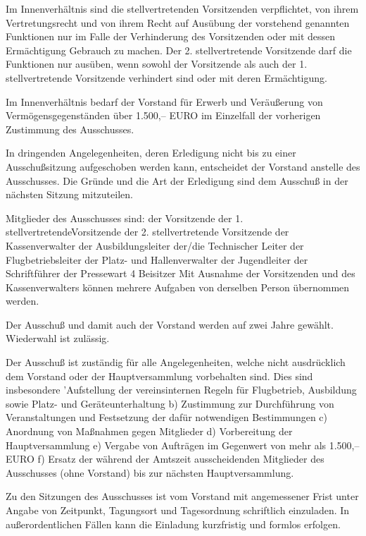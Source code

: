 \documentclass[11pt,a4paper,parskip=half]{scrartcl}
\begin{document}
\begin{contract}
\begin{multicols}{2}
		Im Innenverhältnis sind die stellvertretenden
		Vorsitzenden verpflichtet, von ihrem
		Vertretungsrecht und von ihrem Recht auf
		Ausübung der vorstehend genannten Funktionen
		nur im Falle der Verhinderung des Vorsitzenden
		oder mit dessen Ermächtigung Gebrauch zu
		machen. Der 2. stellvertretende Vorsitzende darf
		die Funktionen nur ausüben, wenn sowohl der
		Vorsitzende als auch der 1. stellvertretende
		Vorsitzende verhindert sind oder mit deren
		Ermächtigung.
		
		Im Innenverhältnis bedarf der Vorstand für
		Erwerb und Veräußerung von
		Vermögensgegenständen über 1.500,-- EURO im
		Einzelfall der vorherigen Zustimmung des
		Ausschusses.
		
		In dringenden Angelegenheiten, deren
		Erledigung nicht bis zu einer Ausschußsitzung
		aufgeschoben werden kann, entscheidet der
		Vorstand anstelle des Ausschusses. Die Gründe und
		die Art der Erledigung sind dem Ausschuß in der
		nächsten Sitzung mitzuteilen.
		
		Mitglieder des Ausschusses
		sind:
		der Vorsitzende
		der 1. stellvertretendeVorsitzende
		der 2. stellvertretende Vorsitzende
		der Kassenverwalter
		der Ausbildungsleiter
		der/die Technischer Leiter
		der Flugbetriebsleiter
		der Platz- und Hallenverwalter
		der Jugendleiter
		der Schriftführer
		der Pressewart
		4 Beisitzer
		Mit Ausnahme der Vorsitzenden und des
		Kassenverwalters können mehrere Aufgaben von
		derselben Person übernommen werden.
		
		Der Ausschuß und damit auch der Vorstand
		werden auf zwei Jahre gewählt. Wiederwahl ist
		zulässig.
		
		Der Ausschuß ist zuständig für alle
		Angelegenheiten, welche nicht ausdrücklich dem
		Vorstand oder der Hauptversammlung vorbehalten
		sind. Dies sind insbesondere
		'Aufstellung der vereinsinternen Regeln für
		Flugbetrieb, Ausbildung sowie Platz- und
		Geräteunterhaltung
		b) Zustimmung zur Durchführung von
		Veranstaltungen und Festsetzung der dafür
		notwendigen Bestimmungen
		c) Anordnung von Maßnahmen gegen Mitglieder
		d) Vorbereitung der Hauptversammlung
		e) Vergabe von Aufträgen im Gegenwert von mehr als 1.500,-- EURO
		f) Ersatz der während der Amtszeit ausscheidenden
		Mitglieder des Ausschusses (ohne Vorstand)
		bis zur nächsten Hauptversammlung.
		
		Zu den Sitzungen des Ausschusses ist vom
		Vorstand
		mit angemessener Frist unter Angabe von
		Zeitpunkt, Tagungsort und Tagesordnung
		schriftlich einzuladen. In außerordentlichen Fällen
		kann die Einladung kurzfristig und formlos
		erfolgen.
		

\end{multicols}
\end{contract}
\end{document}
